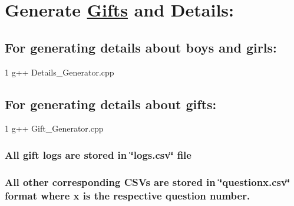  \section*{Generate \hyperlink{classGifts}{Gifts} and Details\+:}

\subsection*{For generating details about boys and girls\+:}


\begin{DoxyCode}
1 g++ Details\_Generator.cpp
\end{DoxyCode}


\subsection*{For generating details about gifts\+:}


\begin{DoxyCode}
1 g++ Gift\_Generator.cpp
\end{DoxyCode}
 \subsubsection*{All gift logs are stored in \char`\"{}logs.\+csv\char`\"{} file}

\subsubsection*{All other corresponding C\+S\+Vs are stored in \char`\"{}questionx.\+csv\char`\"{} format where x is the respective question number.}